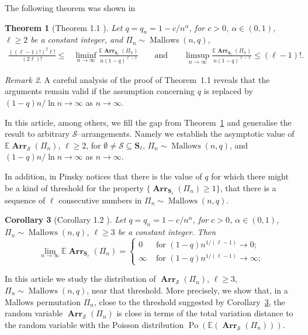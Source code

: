 \documentclass[letterpaper,11pt]{article}
\newtheorem{theorem}{Theorem}[section]
\newtheorem{corollary}[theorem]{Corollary}
\theoremstyle{definition}
\theoremstyle{remark}
\newtheorem{remark}[theorem]{Remark}
\renewcommand{\le}{\leqslant}
\renewcommand{\ge}{\geqslant}
\DeclareMathOperator{\Mallow}{Mallows}
\newcommand{\bE}{\mathbb{E}}
\newcommand{\bS}{\mathbf{S}}
\newcommand{\Arr}{\ensuremath{\operatorname{\mathbf{Arr}}}}
\newcommand{\cS}{\mathcal{S}}
\begin{document}
The following theorem was shown in \cite{Pinsky2022}
\begin{theorem}[Theorem 1.1 \cite{Pinsky2022}]\label{Thm:Pinsky}
	Let $q=q_n=1-c/n^{\alpha}$, for $c>0$, $\alpha\in (0,1)$, $\ell\ge 2$  be a constant integer, and
	$\varPi_n\sim\Mallow(n,q)$,
	\begin{align*}
		\frac{((\ell-1)!)^2\ell!}{(2\ell)!}\le &\liminf_{n\to\infty}{\frac{\bE \Arr_{\bS_\ell}(\varPi_n)}{n(1-q)^{\ell-1}}} &&\text{ and }& &\limsup_{n\to\infty}{\frac{\bE \Arr_{\bS_\ell}(\varPi_n)}{n(1-q)^{\ell-1}}}
		\le (\ell-1)!.
	\end{align*}
\end{theorem}
\begin{remark}\label{Rem:Thm:Pinsky}
	A careful analysis of the proof of Theorem~1.1 \cite{Pinsky2022} reveals that the arguments remain valid if the assumption concerning 
	$q$
	is replaced by 
	$(1-q)n/\ln n \to \infty$ as $n\to\infty$. 
\end{remark}
In this article, among others, we fill the gap from Theorem~\ref{Thm:Pinsky} and generalise the result to arbitrary $\cS$--arrangements. Namely we  establish the asymptotic value of  $\bE \Arr_{\cS}(\varPi_n)$, $\ell\ge 2$, for $\emptyset\neq\cS\subseteq \bS_\ell$, $\varPi_n\sim\Mallow(n,q)$, and $(1-q)n/\ln n \to \infty$ as $n\to\infty$. 	

In addition, in \cite{Pinsky2022} Pinsky notices that there is the value of $q$ for which there might be a kind of threshold for the property $\{\Arr_{\bS_\ell}(\varPi_n)\ge 1\}$, that there is a sequence of $\ell$ consecutive numbers in $\varPi_n\sim\Mallow(n,q)$. 
\begin{corollary}[Corollary 1.2 \cite{Pinsky2022}]\label{Cor:Pinsky}
	Let	$q=q_n=1-c/n^{\alpha}$, for $c>0$, $\alpha\in (0,1)$, \\
	$\varPi_n\sim\Mallow(n,q)$, $\ell\ge 3$  be a constant integer. Then\\
	\[\lim_{n\to\infty}\bE\Arr_{\bS_\ell}(\varPi_n)=
	\begin{cases}
		0&\text{ for }(1-q)n^{1/(\ell-1)}\to 0;\\
		\infty&\text{ for }(1-q)n^{1/(\ell-1)}\to \infty;
	\end{cases}	\]
\end{corollary}
In this article we study the distribution of $\Arr_\cS(\varPi_n)$, $\ell\ge 3$, $\varPi_n\sim\Mallow(n,q)$, near that threshold. More precisely, we show that, in a Mallows permutation $\varPi_n$, close to the threshold suggested by Corollary~\ref{Cor:Pinsky}, the random variable $\Arr_\cS(\varPi_n)$ is close in terms of the total variation distance to the random variable with the Poisson distribution $\operatorname{Po}(\bE (\Arr_\cS(\varPi_n)))$.
\end{document}
